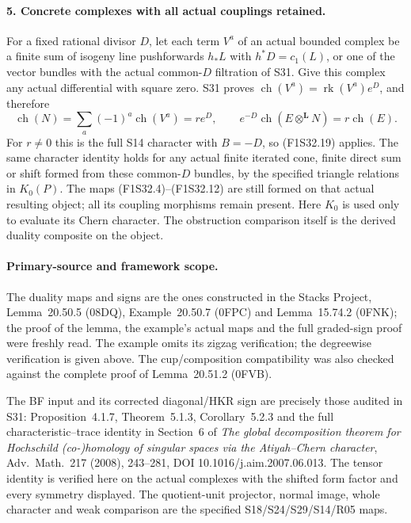 \paragraph{5. Concrete complexes with all actual couplings retained.}
For a fixed rational divisor $D$, let each term
$V^a$ of an actual bounded complex be a finite
sum of isogeny line pushforwards $h_*L$ with
$h^*D=c_1(L)$, or one of the vector bundles
with the actual common-$D$ filtration of S31.
Give this complex any actual differential with
square zero.
S31 proves $\operatorname{ch}(V^a)
=\operatorname{rk}(V^a)e^D$, and therefore
\[
 \operatorname{ch}(N)
       =\sum_a(-1)^a\operatorname{ch}(V^a)
       =r e^D,\qquad
 e^{-D}\operatorname{ch}(E\otimes^{\mathbf L}N)
       =r\operatorname{ch}(E).
 \tag{F1S32.20}
\]
For $r\ne0$ this is the full S14 character with
$B=-D$, so (F1S32.19) applies.
The same character identity holds for any actual
finite iterated cone, finite direct sum or shift
formed from these common-$D$ bundles, by the
specified triangle relations in $K_0(P)$.
The maps (F1S32.4)--(F1S32.12) are still formed on
that actual resulting object; all its coupling
morphisms remain present.
Here $K_0$ is used only to evaluate its Chern
character. The obstruction comparison itself is
the derived duality composite on the object.

\paragraph{Primary-source and framework scope.}
The duality maps and signs are the ones constructed
in the Stacks Project, Lemma~20.50.5 (08DQ),
Example~20.50.7 (0FPC) and Lemma~15.74.2 (0FNK);
the proof of the lemma, the example's actual maps
and the full graded-sign proof were freshly read.
The example omits its zigzag verification; the
degreewise verification is given above.
The cup/composition compatibility was also
checked against the complete proof of Lemma~20.51.2
(0FVB).

The BF input and its corrected diagonal/HKR sign
are precisely those audited in S31:
Proposition~4.1.7, Theorem~5.1.3,
Corollary~5.2.3 and the full characteristic--trace
identity in Section~6 of
\emph{The global decomposition theorem for Hochschild
(co-)homology of singular spaces via the
Atiyah--Chern character}, Adv.\ Math.~217 (2008),
243--281, DOI 10.1016/j.aim.2007.06.013.
The tensor identity is verified here on the
actual complexes with the shifted form factor
and every symmetry displayed.
The quotient-unit projector, normal image,
whole character and weak comparison are the
specified S18/S24/S29/S14/R05 maps.

